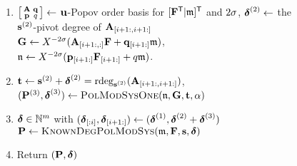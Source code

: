 \documentclass[preprint]{sig-alternate-05-2015}
\begin{document}
\begin{figure}[h!]
{\begin{minipage}{8.2cm}
\begin{algo} 
\begin{enumerate}[{\bf 1.}]
\begin{enumerate}[{\bf a.}]
          $\shifts[d] = -\minDegs^{(1)}+\min(\shifts^{(2)})-2\degMod$,
          $\shifts[v] \in \shiftSpace$ with $[\subVec{\shifts[v]}{}{i} |
          \subVec{\shifts[v]}{i+1}{}] \leftarrow [\shifts[d] | \shifts^{(2)}]$,
          $\shifts[u] = (\shifts[v],\min(\shifts[d]))$
        \item $\left[ \begin{smallmatrix}
            \mat{A} & \col{q} \\
            \row{p} & q 
          \end{smallmatrix} \right]
          \leftarrow$ $\shifts[u]$-Popov order basis for $\trsp{[\trsp{\sys} | \modulus]}$
          and $2\degMod$,
          $\minDegs^{(2)} \leftarrow$ the $\shifts^{(2)}$-pivot degree of $\subMat{\mat{A}}{i+1}{}{i+1}{}$ \\
          $\mat{G} \leftarrow X^{-2\degMod}
          (\subMat{\mat{A}}{i+1}{}{}{} \sys + \subVec{\col{q}}{i+1}{}
          \modulus)$, \\
          $\modulus[n] \leftarrow X^{-2\degMod} (\subVec{\row{p}}{i+1}{}
          \subVec{\sys}{i+1}{} + q \modulus)$. 
        \item $\shifts[t] \leftarrow \shifts^{(2)} + \minDegs^{(2)} = \rdeg[\shifts^{(2)}]{\subMat{\mat{A}}{i+1}{}{i+1}{}}$, \\
          $(\msb^{(3)},\minDegs^{(3)}) \leftarrow \algoname{PolModSysOne}( \modulus[n], \mat{G}, \shifts[t], \alpha )$
        \item $\minDegs \in \NN^\nbun$ with $(\subVec{\minDegs}{}{i},\subVec{\minDegs}{i+1}{}) \leftarrow
          (\minDegs^{(1)},\minDegs^{(2)} + \minDegs^{(3)})$  \\
          $\msb \leftarrow \algoname{KnownDegPolModSys}(\modulus,\sys,\shifts,\minDegs)$
        \item Return $(\msb,\minDegs)$
      \end{enumerate}
      \vspace{-0.1cm}
	\end{enumerate}
\end{algo}
\end{minipage}} 
  \vspace{-0.5cm}
\end{figure}
\end{document}
